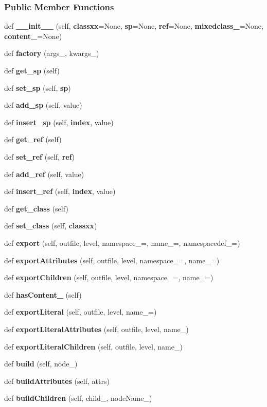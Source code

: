 \subsubsection*{Public Member Functions}
\begin{DoxyCompactItemize}
\item 
def {\bf \+\_\+\+\_\+init\+\_\+\+\_\+} (self, {\bf classxx}=None, {\bf sp}=None, {\bf ref}=None, {\bf mixedclass\+\_\+}=None, {\bf content\+\_\+}=None)
\item 
def {\bf factory} (args\+\_\+, kwargs\+\_\+)
\item 
def {\bf get\+\_\+sp} (self)
\item 
def {\bf set\+\_\+sp} (self, {\bf sp})
\item 
def {\bf add\+\_\+sp} (self, value)
\item 
def {\bf insert\+\_\+sp} (self, {\bf index}, value)
\item 
def {\bf get\+\_\+ref} (self)
\item 
def {\bf set\+\_\+ref} (self, {\bf ref})
\item 
def {\bf add\+\_\+ref} (self, value)
\item 
def {\bf insert\+\_\+ref} (self, {\bf index}, value)
\item 
def {\bf get\+\_\+class} (self)
\item 
def {\bf set\+\_\+class} (self, {\bf classxx})
\item 
def {\bf export} (self, outfile, level, namespace\+\_\+=\textquotesingle{}\textquotesingle{}, name\+\_\+=\textquotesingle{}, namespacedef\+\_\+=\textquotesingle{}\textquotesingle{})
\item 
def {\bf export\+Attributes} (self, outfile, level, namespace\+\_\+=\textquotesingle{}\textquotesingle{}, name\+\_\+=\textquotesingle{})
\item 
def {\bf export\+Children} (self, outfile, level, namespace\+\_\+=\textquotesingle{}\textquotesingle{}, name\+\_\+=\textquotesingle{})
\item 
def {\bf has\+Content\+\_\+} (self)
\item 
def {\bf export\+Literal} (self, outfile, level, name\+\_\+=\textquotesingle{})
\item 
def {\bf export\+Literal\+Attributes} (self, outfile, level, name\+\_\+)
\item 
def {\bf export\+Literal\+Children} (self, outfile, level, name\+\_\+)
\item 
def {\bf build} (self, node\+\_\+)
\item 
def {\bf build\+Attributes} (self, attrs)
\item 
def {\bf build\+Children} (self, child\+\_\+, node\+Name\+\_\+)
\end{DoxyCompactItemize}

